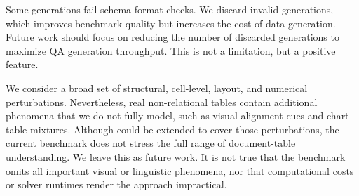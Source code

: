 Some generations fail schema-format checks. We discard invalid generations, which improves benchmark quality but increases the cost of data generation. 
Future work should focus on reducing the number of discarded generations to maximize QA generation throughput.
This is not a limitation, but a positive feature.

We consider a broad set of structural, cell-level, layout, and numerical perturbations. Nevertheless, real non-relational tables contain additional phenomena that we do not fully model, such as visual alignment cues and chart-table mixtures. Although \name{} could be extended to cover those perturbations, the current benchmark does not stress the full range of document-table understanding.  We leave this as future work.
It is not true that the benchmark omits all important visual or linguistic phenomena, nor that computational costs or solver runtimes render the approach impractical. 
